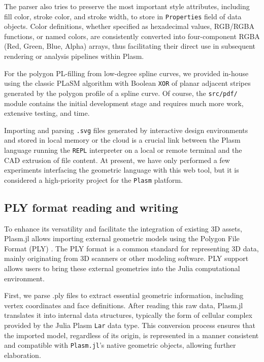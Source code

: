 \documentclass{juliacon}
\begin{document}
The parser also tries to preserve the most important style attributes, including fill color, stroke color, and stroke width, to store in {\tt Properties} field of data objects. Color definitions, whether specified as hexadecimal values, RGB/RGBA functions, or named colors, are consistently converted into four-component RGBA (Red, Green, Blue, Alpha) arrays, thus facilitating their direct use in subsequent rendering or analysis pipelines within Plasm.

For the polygon PL-filling from low-degree spline curves, we provided in-house using the classic PLaSM algorithm \cite{Paoluzzi2003a} with Boolean {\tt XOR} of planar adjacent stripes generated by the polygon profile of a spline curve. Of course, the {\tt src/pdf/} module contains the initial development stage and requires much more work, extensive testing, and time.

Importing and parsing {\tt .svg} files generated by interactive design environments and stored in local memory or the cloud is a crucial link between the Plasm language running the {\tt REPL} interpreter on a local or remote terminal and the CAD extrusion of file content. At present, we have only performed a few experiments interfacing the geometric language with this web tool, but it is considered a high-priority project for the {\tt Plasm} platform.


\subsection{PLY format reading and writing}
\label{subsec:title_auth}

To enhance its versatility and facilitate the integration of existing 3D assets, Plasm.jl allows importing external geometric models using the Polygon File Format (PLY) 
\cite{mathworks-ply-format}. The PLY format is a common standard for representing 3D data, mainly originating from 3D scanners or other modeling software. PLY support allows users to bring these external geometries into the Julia computational environment.

First, we parse {.ply} files to extract essential geometric information, including vertex coordinates and face definitions. After reading this raw data, {Plasm.jl} translates it into internal data structures, typically the form of cellular complex provided by the Julia Plasm {\tt Lar} data type. This conversion process ensures that the imported model, regardless of its origin, is represented in a manner consistent and compatible with {\tt Plasm.jl}’s native geometric objects, allowing further elaboration.
\end{document}
